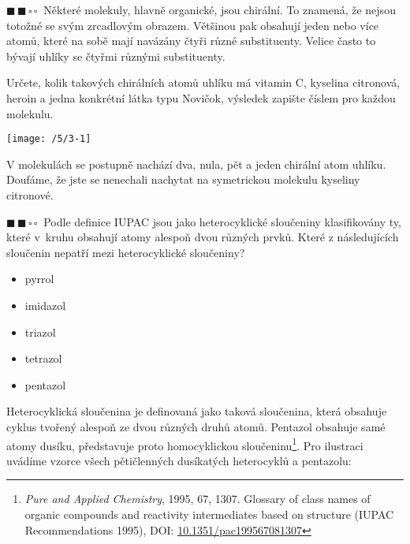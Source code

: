 \documentclass{book}
\newcommand{\dva}{$\blacksquare \, \blacksquare \, \square \, \square \; \; $}
\renewenvironment{quotation}{\par}{\par} %
\begin{document}
\hrulefill %
\begin{quotation}
\dva Některé molekuly, hlavně organické, jsou chirální. To znamená, že
nejsou totožné se svým zrcadlovým obrazem. Většinou pak obsahují jeden
nebo více atomů, které na sobě mají navázány čtyři různé substituenty.
Velice často to bývají uhlíky se čtyřmi různými substituenty.

Určete, kolik takových chirálních atomů uhlíku má vitamin C, kyselina
citronová, heroin a jedna konkrétní látka typu Novičok, výsledek zapište
číslem pro každou molekulu. 
\begin{center}
\texttt{[image: /5/3-1]} 
\par\end{center}

\end{quotation} \dotfill \par 
V molekulách se postupně nachází dva, nula, pět a jeden chirální atom
uhlíku. Doufáme, že jste se nenechali nachytat na symetrickou molekulu
kyseliny citronové.

\hrulefill %
\begin{quotation}
\dva Podle definice IUPAC jsou jako heterocyklické sloučeniny klasifikovány
ty, které v~kruhu obsahují atomy alespoň dvou různých prvků. Které
z následujících sloučenin nepatří mezi heterocyklické sloučeniny? 
\begin{itemize}
\item pyrrol 
\item imidazol 
\item triazol 
\item tetrazol 
\item pentazol
\end{itemize}
\end{quotation} \dotfill \par 

Heterocyklická sloučenina je definovaná jako taková sloučenina, která obsahuje cyklus tvořený alespoň ze dvou různých druhů atomů. Pentazol obsahuje samé atomy dusíku, představuje proto homocyklickou
sloučeninu\footnote{\textit{Pure and Applied  Chemistry}, 1995, 67, 1307. Glossary of class names of organic compounds
and reactivity intermediates based on structure (IUPAC Recommendations
1995), DOI: \href{https://doi.org/10.1351/pac199567081307}{\underline{10.1351/pac199567081307}}}.
Pro ilustraci uvádíme vzorce všech pětičlenných dusíkatých heterocyklů a pentazolu:
\end{document}
